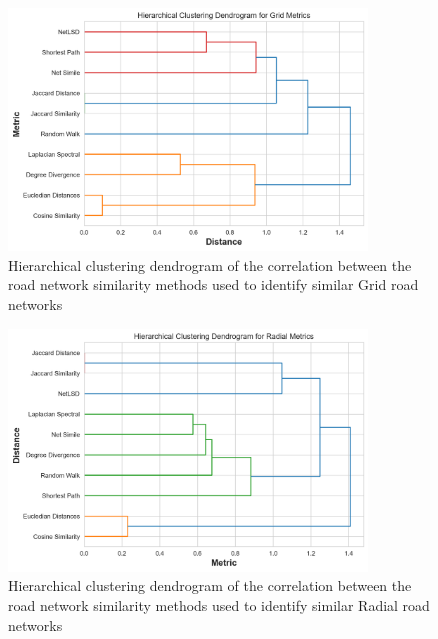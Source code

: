 
\begin{figure}[!ht]
\centering
\includegraphics[width=0.85\textwidth,center]{picture/Grid/grid_metrics_dendrogram.png}
\caption[Hierarchical Clustering Dendrogram of the Correlation between the Road Network Similarity Methods for Grid Road Networks]{Hierarchical clustering dendrogram of the correlation between the road network similarity methods used to identify similar Grid road networks}
\label{fig:Hierarchical Clustering Dendrogram of the Correlation between the Road Network Similarity Methods for Grid Road Networks}
\end{figure}

\begin{figure}[!ht]
\centering
\includegraphics[width=0.85\textwidth,center]{picture/Radial/radial_metrics_dendrogram.png}
\caption[Hierarchical Clustering Dendrogram of the Correlation between the Road Network Similarity Methods for Radial Road Networks]{Hierarchical clustering dendrogram of the correlation between the road network similarity methods used to identify similar Radial road networks}
\label{fig:Hierarchical Clustering Dendrogram of the Correlation between the Road Network Similarity Methods for Radial Road Networks}
\end{figure}

